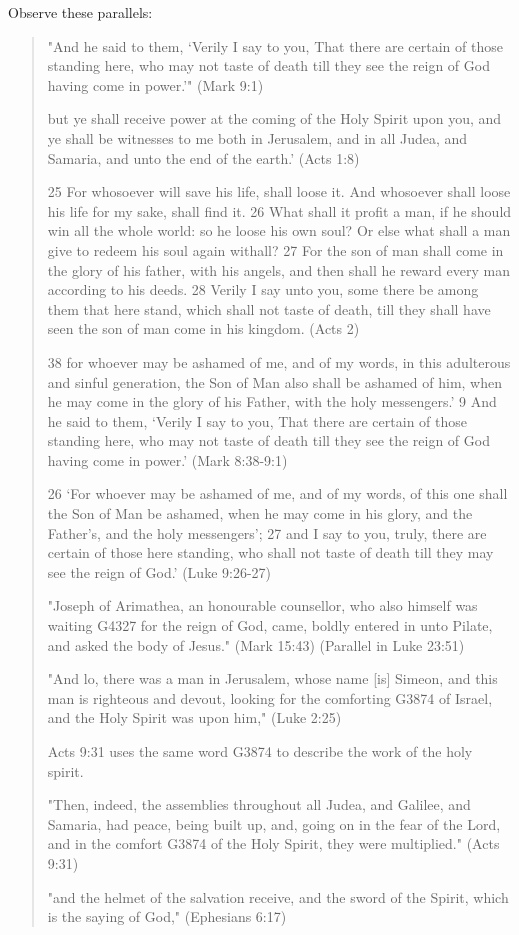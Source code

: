 \documentclass[11pt]{article}
\begin{document}
Observe these parallels:
\begin{quote}
"And he said to them, ‘Verily I say to you, That there are certain of those standing here, who may not taste of death till they see the reign of God having come in power.’" (Mark 9:1)

but ye shall receive power at the coming of the Holy Spirit upon you, and ye shall be witnesses to me both in Jerusalem, and in all Judea, and Samaria, and unto the end of the earth.' (Acts 1:8)


25 For whosoever will save his life, shall loose it. And whosoever shall loose his life for my sake, shall find it. 26 What shall it profit a man, if he should win all the whole world: so he loose his own soul? Or else what shall a man give to redeem his soul again withall? 27 For the son of man shall come in the glory of his father, with his angels, and then shall he reward every man according to his deeds. 28 Verily I say unto you, some there be among them that here stand, which shall not taste of death, till they shall have seen the son of man come in his kingdom. (Acts 2)

38 for whoever may be ashamed of me, and of my words, in this adulterous and sinful generation, the Son of Man also shall be ashamed of him, when he may come in the glory of his Father, with the holy messengers.'
9 And he said to them, `Verily I say to you, That there are certain of those standing here, who may not taste of death till they see the reign of God having come in power.' (Mark 8:38-9:1)

26 `For whoever may be ashamed of me, and of my words, of this one shall the Son of Man be ashamed, when he may come in his glory, and the Father's, and the holy messengers';
27 and I say to you, truly, there are certain of those here standing, who shall not taste of death till they may see the reign of God.' (Luke 9:26-27) 


"Joseph of Arimathea, an honourable counsellor, who also himself was waiting G4327 for the reign of God, came, boldly entered in unto Pilate, and asked the body of Jesus." (Mark 15:43) (Parallel in Luke 23:51)

"And lo, there was a man in Jerusalem, whose name [is] Simeon, and this man is righteous and devout, looking for the comforting G3874 of Israel, and the Holy Spirit was upon him," (Luke 2:25)

Acts 9:31 uses the same word G3874 to describe the work of the holy spirit.

 "Then, indeed, the assemblies throughout all Judea, and Galilee, and Samaria, had peace, being built up, and, going on in the fear of the Lord, and in the comfort G3874 of the Holy Spirit, they were multiplied." (Acts 9:31)

"and the helmet of the salvation receive, and the sword of the Spirit, which is the saying of God," (Ephesians 6:17)
\end{quote}
\end{document}
